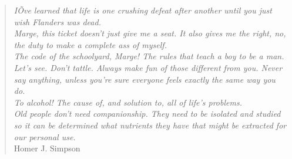 \phantom{.}
\vspace{4in}

\begin{singlespace}
\begin{quote}
  \textit{IÕve learned that life is one crushing defeat after another until you just wish Flanders was dead.}\\
  \textit{Marge, this ticket doesn't just give me a seat. It also gives me the right, no, the duty to make a complete ass of myself.}\\
   \textit{The code of the schoolyard, Marge! The rules that teach a boy to be a man. Let's see. Don't tattle. Always make fun of those different from you. Never say anything, unless you're sure everyone feels exactly the same way you do.}\\
   \textit{To alcohol! The cause of, and solution to, all of life's problems.}\\
   \textit{Old people don't need companionship. They need to be isolated and studied so it can be determined what nutrients they have that might be extracted for our personal use.}\\
  \hfill{Homer J. Simpson}
\end{quote}
\end{singlespace}

%
